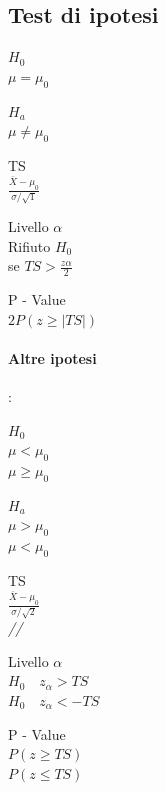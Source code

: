 \documentclass[]{article}
\begin{document}
    \subsection{Test di ipotesi}
    \begin{minipage}{0.2\textwidth}
        $H_0$ \\[2ex]
        $\mu = \mu_0$
    \end{minipage}
    \begin{minipage}{0.2\textwidth}
        $H_a$ \\[2ex]
        $\mu \not= \mu_0$
    \end{minipage}
    \begin{minipage}{0.2\textwidth}
        TS \\[2ex]
        $\frac{\overline{X} - \mu_0}{\sigma / \sqrt{1}}$
    \end{minipage}
    \begin{minipage}{0.2\textwidth}
        Livello $\alpha$ \\[2ex]
        Rifiuto $H_0$ \\
        se $TS > \frac{z\alpha}{2}$
    \end{minipage}
    \begin{minipage}{0.2\textwidth}
        P - Value \\[2ex]
        $2P(z \geq |TS|)$
    \end{minipage}
    \paragraph{Altre ipotesi}: \\[2ex]
    \begin{minipage}{0.2\textwidth}
        $H_0$ \\[2ex]
        $\mu < \mu_0$ \\
        $\mu \geq \mu_0$
    \end{minipage}
    \begin{minipage}{0.2\textwidth}
        $H_a$ \\[2ex]
        $\mu > \mu_0$ \\
        $\mu < \mu_0$
    \end{minipage}
    \begin{minipage}{0.2\textwidth}
        TS \\[2ex]
        $\frac{\overline{X} - \mu_0}{\sigma / \sqrt{2}}$ \\
        \textit{//}
    \end{minipage}
    \begin{minipage}{0.2\textwidth}
        Livello $\alpha$ \\[2ex]
        $H_0 \quad z_\alpha > TS$ \\
        $H_0 \quad z_\alpha < -TS$
    \end{minipage}
    \begin{minipage}{0.2\textwidth}
        P - Value \\[2ex]
        $P(z\geq TS)$ \\
        $P(z \leq TS)$
    \end{minipage}
\end{document}
